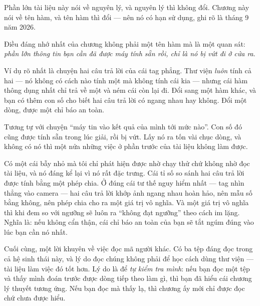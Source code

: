 \documentclass[../../marker.tex]{subfiles}
\begin{document}
\begin{traloi}
\end{traloi}

\begin{dongian}
Phần lớn tài liệu này nói về nguyên lý, và nguyên lý thì không đổi. Chương này nói về tên hàm, và tên hàm thì đổi --- nên nó có hạn sử dụng, ghi rõ là tháng 9 năm 2026.

Điều đáng nhớ nhất của chương không phải một tên hàm mà là một quan sát: \emph{phần lớn thông tin bạn cần đã được máy tính sẵn rồi, chỉ là nó bị vứt đi ở cửa ra}.

Ví dụ rõ nhất là chuyện hai câu trả lời của cái tag phẳng. Thư viện \emph{luôn} tính cả hai --- nó không có cách nào tính một mà không tính cái kia --- nhưng cái hàm thông dụng nhất chỉ trả về một và ném cái còn lại đi. Đổi sang một hàm khác, và bạn có thêm con số cho biết hai câu trả lời có ngang nhau hay không. Đổi một dòng, được một chỉ báo an toàn.

Tương tự với chuyện ``máy tin vào kết quả của mình tới mức nào''. Con số đó cũng được tính sẵn trong lúc giải, rồi bị vứt. Lấy nó ra tốn vài chục dòng, và không có nó thì một nửa những việc ở phần trước của tài liệu không làm được.

Có một cái bẫy nhỏ mà tôi chỉ phát hiện được nhờ chạy thử chứ không nhờ đọc tài liệu, và nó đáng kể lại vì nó rất đặc trưng. Cái tỉ số so sánh hai câu trả lời được tính bằng một phép chia. Ở đúng cái tư thế nguy hiểm nhất --- tag nhìn thẳng vào camera --- hai câu trả lời khớp ảnh ngang nhau hoàn hảo, nên mẫu số bằng không, nên phép chia cho ra một giá trị vô nghĩa. Và một giá trị vô nghĩa thì khi đem so với ngưỡng sẽ luôn ra ``không đạt ngưỡng'' theo cách im lặng. Nghĩa là: nếu không cẩn thận, cái chỉ báo an toàn của bạn sẽ tắt ngúm đúng vào lúc bạn cần nó nhất.

Cuối cùng, một lời khuyên về việc đọc mã người khác. Có ba tệp đáng đọc trong cả hệ sinh thái này, và lý do đọc chúng không phải để học cách dùng thư viện --- tài liệu làm việc đó tốt hơn. Lý do là để \emph{tự kiểm tra mình}: nếu bạn đọc một tệp và thấy mình đoán trước được dòng tiếp theo làm gì, thì bạn đã hiểu cái chương lý thuyết tương ứng. Nếu bạn đọc mà thấy lạ, thì chương ấy mới chỉ được đọc chứ chưa được hiểu.


\end{dongian}
\end{document}
